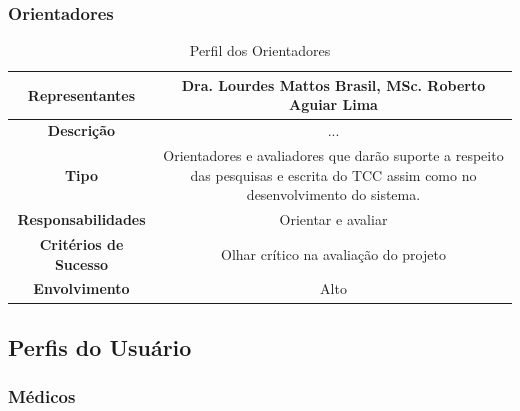 \begin{anexosenv}
\subsubsection{Orientadores}

    \begin{table}[]
        \centering
        \caption{Perfil dos Orientadores}
        \begin{tabular}{@{}|c|c|@{}}
        \toprule
        \textbf{Representantes}       & Dra. Lourdes Mattos Brasil, MSc. Roberto Aguiar Lima                                                                             \\ \midrule
        \textbf{Descrição}            & ...                                                                                                                              \\ \midrule
        \textbf{Tipo}                 & Orientadores e avaliadores que darão suporte a respeito das pesquisas e escrita do TCC assim como no desenvolvimento do sistema. \\ \midrule
        \textbf{Responsabilidades}    & Orientar e avaliar                                                                                                               \\ \midrule
        \textbf{Critérios de Sucesso} & Olhar crítico na avaliação do projeto                                                                                            \\ \midrule
        \textbf{Envolvimento}         & Alto                                                                                                                             \\ \bottomrule
        \end{tabular}
        \label{table:Perfil dos Orientadores}
    \end{table}

\subsection{Perfis do Usuário}

\subsubsection{Médicos}


\end{anexosenv}
